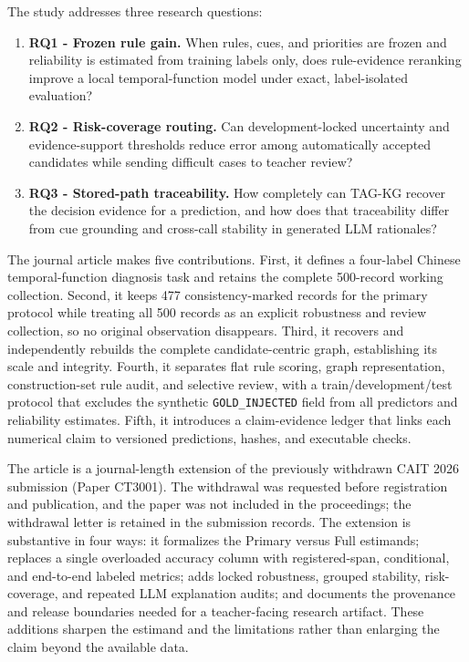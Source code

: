 \documentclass{CUP-JNL-NLP}
\begin{document}
The study addresses three research questions:

\begin{enumerate}
\item \textbf{RQ1 - Frozen rule gain.} When rules, cues, and priorities are frozen and reliability is estimated from training labels only, does rule-evidence reranking improve a local temporal-function model under exact, label-isolated evaluation?
\item \textbf{RQ2 - Risk-coverage routing.} Can development-locked uncertainty and evidence-support thresholds reduce error among automatically accepted candidates while sending difficult cases to teacher review?
\item \textbf{RQ3 - Stored-path traceability.} How completely can TAG-KG recover the decision evidence for a prediction, and how does that traceability differ from cue grounding and cross-call stability in generated LLM rationales?
\end{enumerate}
The journal article makes five contributions. First, it defines a four-label Chinese temporal-function diagnosis task and retains the complete 500-record working collection. Second, it keeps 477 consistency-marked records for the primary protocol while treating all 500 records as an explicit robustness and review collection, so no original observation disappears. Third, it recovers and independently rebuilds the complete candidate-centric graph, establishing its scale and integrity. Fourth, it separates flat rule scoring, graph representation, construction-set rule audit, and selective review, with a train/development/test protocol that excludes the synthetic \texttt{GOLD\_INJECTED} field from all predictors and reliability estimates. Fifth, it introduces a claim-evidence ledger that links each numerical claim to versioned predictions, hashes, and executable checks.

The article is a journal-length extension of the previously withdrawn CAIT 2026 submission (Paper CT3001). The withdrawal was requested before registration and publication, and the paper was not included in the proceedings; the withdrawal letter is retained in the submission records. The extension is substantive in four ways: it formalizes the Primary versus Full estimands; replaces a single overloaded accuracy column with registered-span, conditional, and end-to-end labeled metrics; adds locked robustness, grouped stability, risk-coverage, and repeated LLM explanation audits; and documents the provenance and release boundaries needed for a teacher-facing research artifact. These additions sharpen the estimand and the limitations rather than enlarging the claim beyond the available data.
\end{document}
